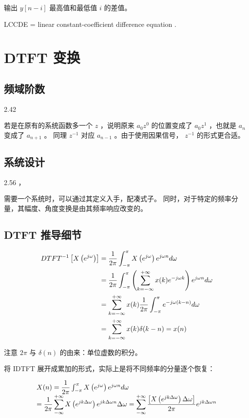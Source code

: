 \documentclass[cn,11pt,chinese,black,simple]{elegantbook}
\begin{document}
输出 \(y[n-i]\) 最高值和最低值 \(i\) 的差值。

LCCDE = linear constant-coefficient difference equation .



\chapter{DTFT 变换}


\section{频域阶数}

2.42

若是在原有的系统函数多一个 \(z\) ，说明原来 \(a_0 z^0\) 的位置变成了 \(a_0 z^1\) ，也就是 \(a_n\) 变成了 \(a_{n+1}\) 。 同理 \(z^{-1}\) 对应 \(a_{n-1}\) 。由于使用因果信号， \(z^{-1}\) 的形式更合适。

\section{系统设计}

2.56 ，

需要一个系统时，可以通过其定义入手，配凑式子。 同时，对于特定的频率分量，其幅度、角度变换是由其频率响应改变的。

\section{DTFT 推导细节}

\[
\begin{aligned}
D T F T^{-1}\left[X\left(e^{j \omega}\right)\right]&=\dfrac{1}{2 \pi} \int_{-\pi}^{\pi} X\left(e^{j \omega}\right) e^{j \omega n} d \omega \\
&=\dfrac{1}{2 \pi} \int_{-\pi}^{\pi}\left(\displaystyle\sum_{k=-\infty}^{+\infty} x(k) e^{-j \omega k}\right) e^{j \omega n} d \omega \\
&=\displaystyle\sum_{k=-\infty}^{+\infty} x(k) \dfrac{1}{2 \pi} \int_{-\pi}^{\pi} e^{-j \omega(k-n)} d \omega\\
&=\displaystyle\sum_{k=-\infty}^{+\infty} x(k) \delta(k-n)=x(n)
\end{aligned}
\]

注意  \(2\pi\) 与 \(\delta(n)\) 的由来：单位虚数的积分。

将 IDTFT 展开成累加的形式，实际上是将不同频率的分量逐个恢复：

\begin{align*}
    \begin{array}{l}
    X(n)=\dfrac{1}{2 \pi} \int_{-\pi}^{\pi} X\left(e^{j \omega}\right) e^{j \omega n} d \omega \\
    =\dfrac{1}{2 \pi} \displaystyle\sum_{-\infty}^{+\infty} X\left(e^{j k \Delta \omega}\right) e^{j k \Delta \omega n} \Delta \omega=\displaystyle\sum_{-\infty}^{+\infty} \dfrac{\left[X\left(e^{j k \Delta \omega}\right) \Delta \omega\right]}{2 \pi} e^{j k \Delta \omega n}
    \end{array}
\end{align*}
\end{document}
